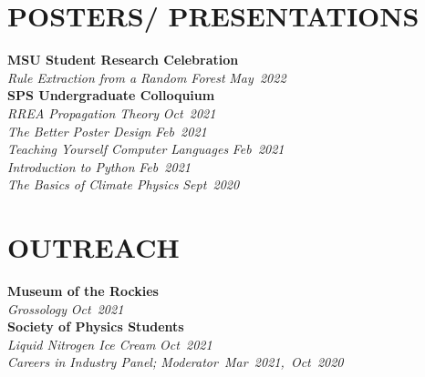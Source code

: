 \documentclass[margin]{res}
\begin{document}
\begin{resume}
\section{POSTERS/ PRESENTATIONS}

\textbf{MSU Student Research Celebration}\\
\hspace{3ex} {\sl Rule Extraction from a Random Forest} \hfill {\sl May~2022}\vspace*{1ex}\\
\textbf{SPS Undergraduate Colloquium}\vspace*{0.5ex}\\
\hspace{3ex} {\sl RREA Propagation Theory} \hfill {\sl Oct~2021}\vspace*{0.5ex}\\
\hspace{3ex} {\sl The Better Poster Design} \hfill {\sl Feb~2021}\vspace*{0.5ex}\\
\hspace{3ex} {\sl Teaching Yourself Computer Languages} \hfill {\sl Feb~2021}\vspace*{0.5ex}\\
\hspace{3ex} {\sl Introduction to Python} \hfill {\sl Feb~2021}\vspace*{0.5ex}\\
\hspace{3ex} {\sl The Basics of Climate Physics} \hfill {\sl Sept~2020}

	
\section{OUTREACH}
\textbf{Museum of the Rockies}\\
\hspace{3ex} {\sl Grossology}\hfill 
{\sl Oct~2021}\vspace*{1ex}\\
\textbf{Society of Physics Students}\vspace*{0.5ex}\\
\hspace{3ex} {\sl Liquid Nitrogen Ice Cream}\hfill 
{\sl Oct~2021}\vspace*{0.5ex}\\
\hspace{3ex} {\sl Careers in Industry Panel; Moderator}\hfill {\sl ~Mar~2021,~Oct~2020}



\end{resume}
\end{document}
